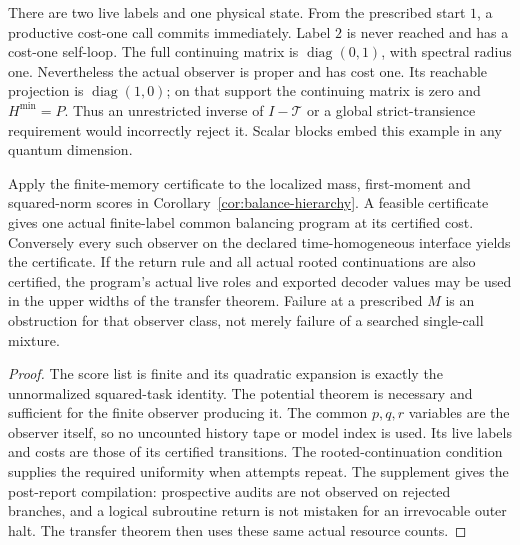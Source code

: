 \begin{example}\label{ex:unreachable-loop}
There are two live labels and one physical state. From the prescribed start $1$, a productive cost-one call commits immediately. Label $2$ is never reached and has a cost-one self-loop. The full continuing matrix is $\operatorname{diag}(0,1)$, with spectral radius one. Nevertheless the actual observer is proper and has cost one. Its reachable projection is $\operatorname{diag}(1,0)$; on that support the continuing matrix is zero and $H^{\min}=P$. Thus an unrestricted inverse of $I-\mathcal T$ or a global strict-transience requirement would incorrectly reject it. Scalar blocks embed this example in any quantum dimension.
\end{example}

\begin{corollary}\label{cor:memory-balance}
Apply the finite-memory certificate to the localized mass, first-moment and squared-norm scores in Corollary~\ref{cor:balance-hierarchy}. A feasible certificate gives one actual finite-label common balancing program at its certified cost. Conversely every such observer on the declared time-homogeneous interface yields the certificate. If the return rule and all actual rooted continuations are also certified, the program's actual live roles and exported decoder values may be used in the upper widths of the transfer theorem. Failure at a prescribed $M$ is an obstruction for that observer class, not merely failure of a searched single-call mixture.
\end{corollary}
\begin{proof}
The score list is finite and its quadratic expansion is exactly the unnormalized squared-task identity. The potential theorem is necessary and sufficient for the finite observer producing it. The common $p,q,r$ variables are the observer itself, so no uncounted history tape or model index is used. Its live labels and costs are those of its certified transitions. The rooted-continuation condition supplies the required uniformity when attempts repeat. The supplement gives the post-report compilation: prospective audits are not observed on rejected branches, and a logical subroutine return is not mistaken for an irrevocable outer halt. The transfer theorem then uses these same actual resource counts.
\end{proof}

